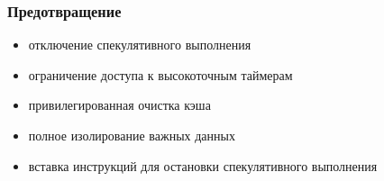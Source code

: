 \subsubsection{Предотвращение}
\begin{frame}{\insertsubsubsection}

  \LARGE

  \begin{itemize}
  \item отключение спекулятивного выполнения
  \item ограничение доступа к высокоточным таймерам
  \item привилегированная очистка кэша
  \item полное изолирование важных данных
  \item вставка инструкций для остановки спекулятивного выполнения
  \end{itemize}


\end{frame}